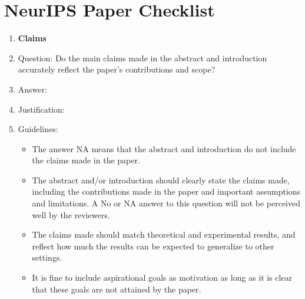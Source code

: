 \documentclass{article}
\begin{document}

\newpage
\section*{NeurIPS Paper Checklist}

\begin{enumerate}

  \item {\bf Claims}
      \item[] Question: Do the main claims made in the abstract and introduction accurately reflect the paper's contributions and scope?
      \item[] Answer: \answerTODO{} %
      \item[] Justification: \justificationTODO{}
      \item[] Guidelines:
      \begin{itemize}
          \item The answer NA means that the abstract and introduction do not include the claims made in the paper.
          \item The abstract and/or introduction should clearly state the claims made, including the contributions made in the paper and important assumptions and limitations. A No or NA answer to this question will not be perceived well by the reviewers. 
          \item The claims made should match theoretical and experimental results, and reflect how much the results can be expected to generalize to other settings. 
          \item It is fine to include aspirational goals as motivation as long as it is clear that these goals are not attained by the paper. 
      \end{itemize}
  

\end{enumerate}
\end{document}
